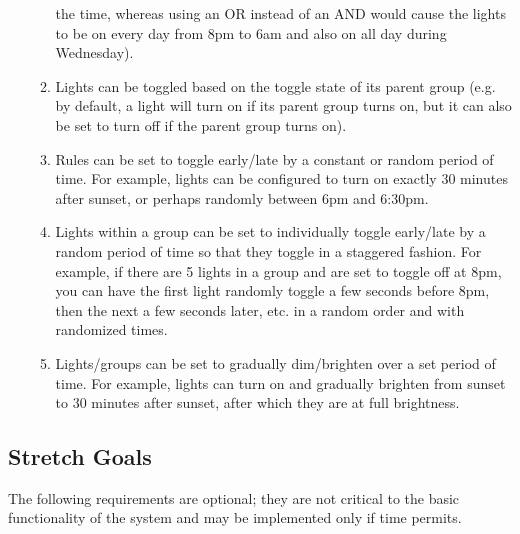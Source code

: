 \documentclass[12pt]{article}
\begin{document}
\begin{enumerate}
\begin{enumerate}
                the time, whereas using an OR instead of an AND would cause the
                lights to be on every day from 8pm to 6am and also on all day
                during Wednesday).
            \item Lights can be toggled based on the toggle state of its parent
                group (e.g. by default, a light will turn on if its parent
                group turns on, but it can also be set to turn off if the
                parent group turns on).
            \item Rules can be set to toggle early/late by a constant or random
                period of time.  For example, lights can be configured to turn
                on exactly 30 minutes after sunset, or perhaps randomly between
                6pm and 6:30pm.
            \item Lights within a group can be set to individually toggle
                early/late by a random period of time so that they toggle in a
                staggered fashion.  For example, if there are 5 lights in a
                group and are set to toggle off at 8pm, you can have the first
                light randomly toggle a few seconds before 8pm, then the next a
                few seconds later, etc. in a random order and with randomized
                times.
            \item Lights/groups can be set to gradually dim/brighten over a set
                period of time.  For example, lights can turn on and gradually
                brighten from sunset to 30 minutes after sunset, after which
                they are at full brightness.
        \end{enumerate}
\end{enumerate}

\subsection{Stretch Goals}

The following requirements are optional; they are not critical to the basic
functionality of the system and may be implemented only if time permits.
\end{document}
